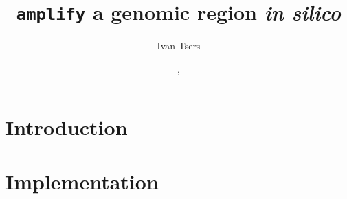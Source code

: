 \documentclass[a4paper]{article}
\begin{document}
\pagestyle{noweb}

\title{\texttt{amplify} a genomic region \textit{in silico}}
\author{Ivan Tsers}
\date{, }
\maketitle
\section{Introduction}

\section{Implementation}

\end{document}
